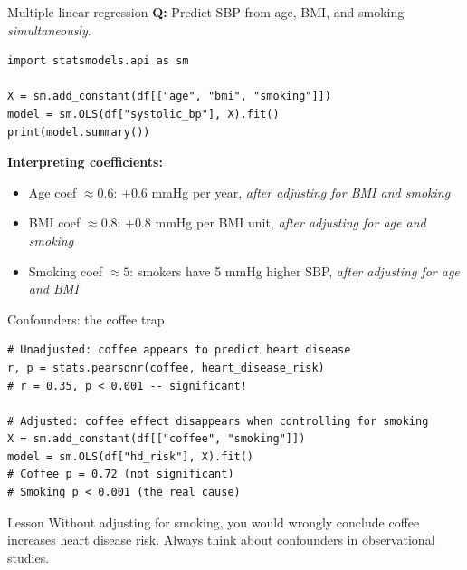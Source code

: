 \documentclass[aspectratio=169,11pt]{beamer}
\begin{document}
\begin{frame}[fragile]{Multiple linear regression}
\textbf{Q:} Predict SBP from age, BMI, and smoking \emph{simultaneously}.

\begin{verbatim}
import statsmodels.api as sm

X = sm.add_constant(df[["age", "bmi", "smoking"]])
model = sm.OLS(df["systolic_bp"], X).fit()
print(model.summary())
\end{verbatim}

\vspace{4pt}
\textbf{Interpreting coefficients:}
\begin{itemize}
  \item Age coef $\approx 0.6$: +0.6 mmHg per year, \emph{after adjusting for BMI and smoking}
  \item BMI coef $\approx 0.8$: +0.8 mmHg per BMI unit, \emph{after adjusting for age and smoking}
  \item Smoking coef $\approx 5$: smokers have 5 mmHg higher SBP, \emph{after adjusting for age and BMI}
\end{itemize}
\end{frame}

\begin{frame}[fragile]{Confounders: the coffee trap}
\begin{verbatim}
# Unadjusted: coffee appears to predict heart disease
r, p = stats.pearsonr(coffee, heart_disease_risk)
# r = 0.35, p < 0.001 -- significant!

# Adjusted: coffee effect disappears when controlling for smoking
X = sm.add_constant(df[["coffee", "smoking"]])
model = sm.OLS(df["hd_risk"], X).fit()
# Coffee p = 0.72 (not significant)
# Smoking p < 0.001 (the real cause)
\end{verbatim}

\begin{alertblock}{Lesson}
Without adjusting for smoking, you would wrongly conclude coffee increases heart disease risk. \alert{Always think about confounders} in observational studies.
\end{alertblock}
\end{frame}
\end{document}
